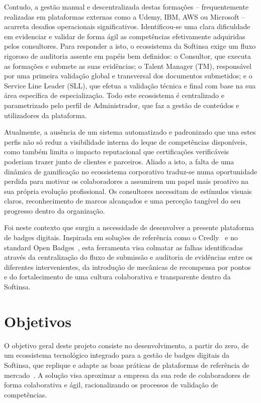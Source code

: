 \documentclass[12pt,a4paper]{report}
\begin{document}
Contudo, a gestão manual e descentralizada destas formações -- frequentemente realizadas em plataformas externas como a Udemy, IBM, AWS ou Microsoft -- acarreta desafios operacionais significativos. Identificou-se uma clara dificuldade em evidenciar e validar de forma ágil as competências efetivamente adquiridas pelos consultores. Para responder a isto, o ecossistema da Softinsa exige um fluxo rigoroso de auditoria assente em papéis bem definidos: o Consultor, que executa as formações e submete as suas evidências; o Talent Manager (TM), responsável por uma primeira validação global e transversal dos documentos submetidos; e o Service Line Leader (SLL), que efetua a validação técnica e final com base na sua área específica de especialização. Todo este ecossistema é centralizado e parametrizado pelo perfil de Administrador, que faz a gestão de conteúdos e utilizadores da plataforma.

Atualmente, a ausência de um sistema automatizado e padronizado que una estes perfis não só reduz a visibilidade interna do leque de competências disponíveis, como também limita o impacto reputacional que certificações verificáveis poderiam trazer junto de clientes e parceiros. Aliado a isto, a falta de uma dinâmica de gamificação no ecossistema corporativo traduz-se numa oportunidade perdida para motivar os colaboradores a assumirem um papel mais proativo na sua própria evolução profissional. Os consultores necessitam de estímulos visuais claros, reconhecimento de marcos alcançados e uma perceção tangível do seu progresso dentro da organização.

Foi neste contexto que surgiu a necessidade de desenvolver a presente plataforma de badges digitais. Inspirada em soluções de referência como o Credly~\cite{credly} e no standard Open Badges~\cite{openbadges}, esta ferramenta visa colmatar as falhas identificadas através da centralização do fluxo de submissão e auditoria de evidências entre os diferentes intervenientes, da introdução de mecânicas de recompensa por pontos~\cite{gamification} e do fortalecimento de uma cultura colaborativa e transparente dentro da Softinsa.

\section{Objetivos}

O objetivo geral deste projeto consiste no desenvolvimento, a partir do zero, de um ecossistema tecnológico integrado para a gestão de badges digitais da Softinsa, que replique e adapte as boas práticas de plataformas de referência de mercado~\cite{credly,openbadges}. A solução visa aproximar a empresa da sua rede de colaboradores de forma colaborativa e ágil, racionalizando os processos de validação de competências.
\end{document}
